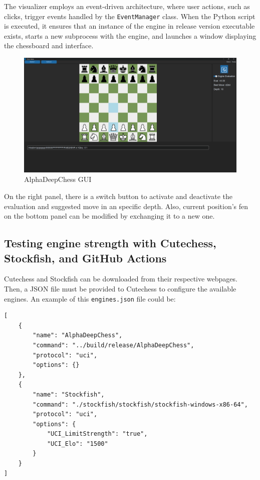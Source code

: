 \noindent The visualizer employs an event-driven architecture, where user actions, such as clicks, trigger events handled by the \texttt{EventManager} class. When the Python script is executed, it ensures that an instance of the engine in release version executable exists, starts a new subprocess with the engine, and launches a window displaying the chessboard and interface.

\begin{figure}[H]
    \centering
    \includegraphics[width=\textwidth]{Imagenes/gui.png}
    \caption{AlphaDeepChess GUI}
    \label{fig:gui}
\end{figure}

On the right panel, there is a switch button to activate and deactivate the evaluation and suggested move in an specific depth. Also, current position's fen on the bottom panel can be modified by exchanging it to a new one.

\subsection{Testing engine strength with Cutechess, Stockfish, and GitHub Actions}

Cutechess and Stockfish can be downloaded from their respective webpages. Then, a JSON file must be provided to Cutechess to configure the available engines. An example of this \texttt{engines.json} file could be:

\vspace{1em}

\begin{lstlisting}[breaklines=true, frame=single]
[
    {
        "name": "AlphaDeepChess",
        "command": "../build/release/AlphaDeepChess",
        "protocol": "uci",
        "options": {}
    },
    {
        "name": "Stockfish",
        "command": "./stockfish/stockfish/stockfish-windows-x86-64",
        "protocol": "uci",
        "options": {
            "UCI_LimitStrength": "true",
            "UCI_Elo": "1500"
        }
    }
]
\end{lstlisting}

